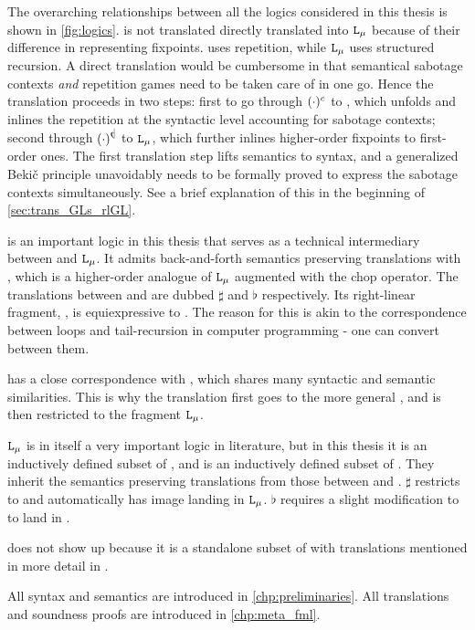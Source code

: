 The overarching relationships between all the logics considered in this thesis is shown in \autoref{fig:logics}. \GLs{} is not translated directly translated into $\Lmu{}$ because of their difference in representing fixpoints. \GLs{} uses repetition, while $\Lmu{}$ uses structured recursion. A direct translation would be cumbersome in that semantical sabotage contexts \textit{and} repetition games need to be taken care of in one go. Hence the translation proceeds in two steps: first to go through $\GLsrl{c}{(\cdot)}$ to \rlGL{}, which unfolds and inlines the repetition at the syntactic level accounting for sabotage contexts; second through $\rlL{(\cdot)}$ to $\Lmu{}$, which further inlines higher-order fixpoints to first-order ones. The first translation step lifts semantics to syntax, and a generalized Beki\v{c} principle unavoidably needs to be formally proved to express the sabotage contexts simultaneously. See a brief explanation of this in the beginning of \autoref{sec:trans_GLs_rlGL}.

\RGL{} is an important logic in this thesis that serves as a technical intermediary between \GLs{} and $\Lmu{}$. It admits back-and-forth semantics preserving translations with \FLC{}, which is a higher-order analogue of $\Lmu{}$ augmented with the chop operator. The translations between \FLC{} and \RGL{} are dubbed $\sharp$ and $\flat$ respectively. Its right-linear fragment, \rlGL{}, is equiexpressive to \GLs{}. The reason for this is akin to the correspondence between loops and tail-recursion in computer programming - one can convert between them.

\RGL{} has a close correspondence with \FLC{}, which shares many syntactic and semantic similarities. This is why the translation first goes to the more general \FLC{}, and is then restricted to the fragment $\Lmu{}$. 

$\Lmu{}$ is in itself a very important logic in literature, but in this thesis it is an inductively defined subset of \FLC{}, and \rlGL{} is an inductively defined subset of \RGL{}. They inherit the semantics preserving translations from those between \FLC{} and \RGL{}. $\sharp$ restricts to \rlGL{} and automatically has image landing in $\Lmu{}$. $\flat$ requires a slight modification to  to land in \rlGL{}. 

\GL{} does not show up because it is a standalone subset of \rlGL{} with translations mentioned in more detail in \cite{Wafa_2024}. 

All syntax and semantics are introduced in \autoref{chp:preliminaries}. All translations and soundness proofs are introduced in \autoref{chp:meta_fml}.

